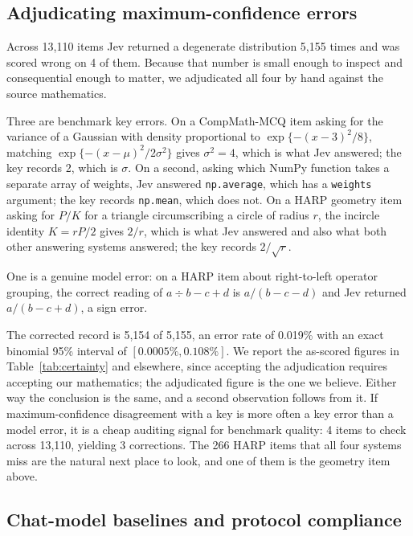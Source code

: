 \documentclass[11pt]{article}
\begin{document}
\subsection{Adjudicating maximum-confidence errors}
\label{sec:adjudication}

Across 13,110 items Jev returned a degenerate distribution 5,155 times and was scored wrong on 4 of them. Because that number is small enough to inspect and consequential enough to matter, we adjudicated all four by hand against the source mathematics.

Three are benchmark key errors. On a CompMath-MCQ item asking for the variance of a Gaussian with density proportional to $\exp\{-(x-3)^2/8\}$, matching $\exp\{-(x-\mu)^2/2\sigma^2\}$ gives $\sigma^2 = 4$, which is what Jev answered; the key records 2, which is $\sigma$. On a second, asking which NumPy function takes a separate array of weights, Jev answered \texttt{np.average}, which has a \texttt{weights} argument; the key records \texttt{np.mean}, which does not. On a HARP geometry item asking for $P/K$ for a triangle circumscribing a circle of radius $r$, the incircle identity $K = rP/2$ gives $2/r$, which is what Jev answered and also what both other answering systems answered; the key records $2/\sqrt{r}$.

One is a genuine model error: on a HARP item about right-to-left operator grouping, the correct reading of $a \div b - c + d$ is $a/(b-c-d)$ and Jev returned $a/(b-c+d)$, a sign error.

The corrected record is 5,154 of 5,155, an error rate of 0.019\% with an exact binomial 95\% interval of $[0.0005\%, 0.108\%]$. We report the as-scored figures in Table~\ref{tab:certainty} and elsewhere, since accepting the adjudication requires accepting our mathematics; the adjudicated figure is the one we believe. Either way the conclusion is the same, and a second observation follows from it. If maximum-confidence disagreement with a key is more often a key error than a model error, it is a cheap auditing signal for benchmark quality: 4 items to check across 13,110, yielding 3 corrections. The 266 HARP items that all four systems miss are the natural next place to look, and one of them is the geometry item above.

\subsection{Chat-model baselines and protocol compliance}
\label{sec:baselines}
\end{document}
